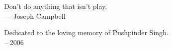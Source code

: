 \thispagestyle{empty}
{}

\vspace*{3cm}

%

\begin{center}
Don't do anything that isn't play. \\ \medskip
    --- Joseph Campbell
\end{center}

\medskip

\begin{center}
    Dedicated to the loving memory of Pushpinder Singh. \\ \,--\,2006
\end{center}
